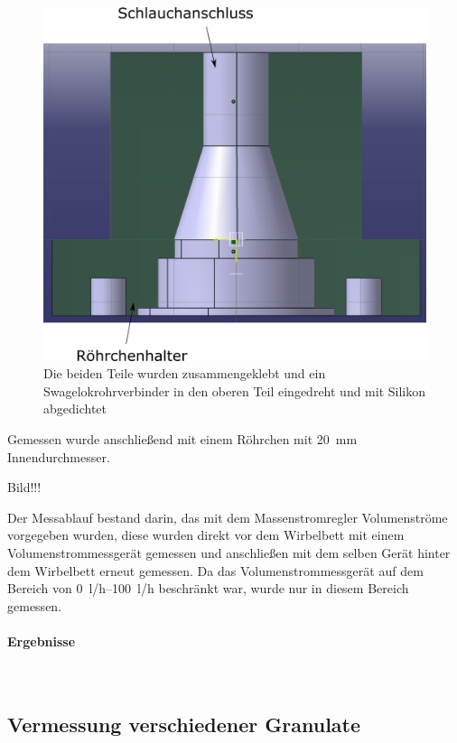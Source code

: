 \begin{figure}[h]
	\begin{center}
		\includegraphics[scale=0.5]{Abnehmer_Volumenstrom.png}
		\caption[Volumenstrommessung]{Die beiden Teile wurden zusammengeklebt und ein Swagelokrohrverbinder in den oberen Teil eingedreht und mit Silikon abgedichtet}
	\end{center}
\end{figure}

Gemessen wurde anschließend mit einem Röhrchen mit \SI{20}{mm} Innendurchmesser.

Bild!!!


Der Messablauf bestand darin, das mit dem Massenstromregler Volumenströme vorgegeben wurden, diese wurden direkt vor dem Wirbelbett mit einem Volumenstrommessgerät gemessen und anschließen mit dem selben Gerät hinter dem Wirbelbett erneut gemessen. Da das Volumenstrommessgerät auf dem Bereich von \SIrange{0}{100}{l/h} beschränkt war, wurde nur in diesem Bereich gemessen.


\paragraph{Ergebnisse}
\hfill \\


\subsection{Vermessung verschiedener Granulate}


